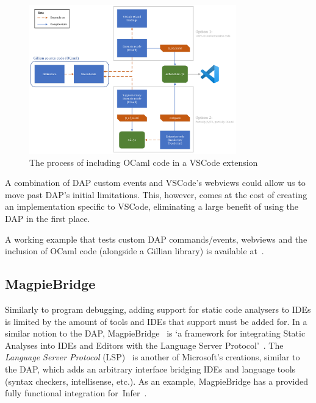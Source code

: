\begin{figure}
  \center{}
  \includegraphics[width=0.8\textwidth]{img/vscode-extension-with-ocaml.png}
  \caption{The process of including OCaml code in a VSCode extension}%
  \label{fig:vscode-extension-with-ocaml}
\end{figure}

\label{sec:background:extending-dap}
A combination of DAP custom events and VSCode's webviews could allow us to move
past DAP's initial limitations. This, however, comes at the cost of creating an
implementation specific to VSCode, eliminating a large benefit of using the DAP
in the first place.

A working example that tests custom DAP commands/events, webviews and the
inclusion of OCaml code (alongside a Gillian library) is available
at~\cite{debugger-experiment}.

\subsection{MagpieBridge}\label{sec:background:magpiebridge}

Similarly to program debugging, adding support for static code analysers to IDEs
is limited by the amount of tools and IDEs that support must be added for. In a
similar notion to the DAP, MagpieBridge~\cite{magpiebridge} is `a framework for
integrating Static Analyses into IDEs and Editors with the Language Server
Protocol'~\cite{magpiebridge-repo}. The \textit{Language Server Protocol}
(LSP)~\cite{lsp} is another of Microsoft's creations, similar to the DAP, which
adds an arbitrary interface bridging IDEs and language tools (syntax checkers,
intellisense, etc.). As an example, MagpieBridge has a provided fully
functional integration for~Infer~\cite{infer-ide}.


